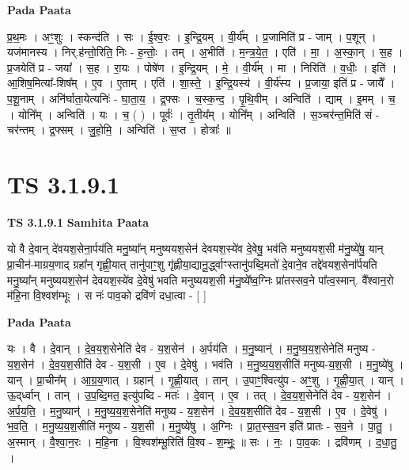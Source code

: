\documentclass[17pt]{extarticle}
\begin{document}
\textbf{Pada Paata} \newline

प्र॒थ॒मः । अꣳ॒॒शुः । स्कन्द॑ति । सः । ई॒श्व॒रः । इ॒न्द्रि॒यम् । वी॒र्य᳚म् । प्र॒जामिति॑ प्र - जाम् । प॒शून् । यज॑मानस्य । निर्.ह॑न्तो॒रिति॒ निः - ह॒न्तोः॒ । तम् । अ॒भीति॑ । म॒न्त्र॒ये॒त॒ । एति॑ । मा॒ । अ॒स्का॒न् । स॒ह । प्र॒जयेति॑ प्र - जया᳚ । स॒ह । रा॒यः । पोषे॑ण । इ॒न्द्रि॒यम् । मे॒ । वी॒र्य᳚म् । मा । निरिति॑ । व॒धीः॒ । इति॑ । आ॒शिष॒मित्या᳚-शिष᳚म् । ए॒व । ए॒ताम् । एति॑ । शा॒स्ते॒ । इ॒न्द्रि॒यस्य॑ । वी॒र्य॑स्य । प्र॒जाया॒ इति॑ प्र - जायै᳚ । प॒शू॒नाम् । अनि॑र्घाता॒येत्यनिः॑ - घा॒ता॒य॒ । द्र॒फ्सः । च॒स्क॒न्द॒ । पृ॒थि॒वीम् । अन्विति॑ । द्याम् । इ॒मम् । च॒ । योनि᳚म् । अन्विति॑ । यः । च॒ ( ) । पूर्वः॑ । तृ॒तीय᳚म् । योनि᳚म् । अन्विति॑ । स॒ञ्चर॑न्त॒मिति॑ सं - चर॑न्तम् । द्र॒फ्सम् । जु॒हो॒मि॒ । अन्विति॑ । स॒प्त । होत्राः᳚ ॥  \newline





\section{ TS 3.1.9.1 }

\textbf{TS 3.1.9.1 } \newline
\textbf{Samhita Paata} \newline

यो वै दे॒वान् दे॑वयश॒सेना॒र्पय॑ति मनु॒ष्या᳚न् मनुष्ययश॒सेन॑ देवयश॒स्ये॑व दे॒वेषु॒ भव॑ति मनुष्ययश॒सी म॑नु॒ष्ये॑षु॒ यान् प्रा॒चीन॑-माग्रय॒णाद् ग्रहा᳚न् गृह्णी॒यात् तानु॑पाꣳ॒॒शु गृ॑ह्णीया॒द्यानू॒र्द्ध्वाꣳस्तानु॑पब्दि॒मतो॑ दे॒वाने॒व तद्दे॑वयश॒सेना᳚र्पयति मनु॒ष्या᳚न् मनुष्ययश॒सेन॑ देवयश॒स्ये॑व दे॒वेषु॑ भवति मनुष्ययश॒सी म॑नु॒ष्ये᳚ष्व॒ग्निः प्रा॑तस्सव॒ने पा᳚त्व॒स्मान्. वै᳚श्वान॒रो म॑हि॒ना वि॒श्वश॑म्भूः । स नः॑ पाव॒को द्रवि॑णं दधा॒त्वा - [  ] \newline

\textbf{Pada Paata} \newline

यः । वै । दे॒वान् । दे॒व॒य॒श॒सेनेति॑ देव - य॒श॒सेन॑ । अ॒र्पय॑ति । म॒नु॒ष्यान्॑ । म॒नु॒ष्य॒य॒श॒सेनेति॑ मनुष्य - य॒श॒सेन॑ । दे॒व॒य॒श॒सीति॑ देव - य॒श॒सी । ए॒व । दे॒वेषु॑ । भव॑ति । म॒नु॒ष्य॒य॒श॒सीति॑ मनुष्य-य॒श॒सी । म॒नु॒ष्ये॑षु । यान् । प्रा॒चीन᳚म् । आ॒ग्र॒य॒णात् । ग्रहान्॑ । गृ॒ह्णी॒यात् । तान् । उ॒पाꣳ॒॒श्वित्यु॑प - अꣳ॒॒शु । गृ॒ह्णी॒या॒त् । यान् । ऊ॒द्‌र्ध्वान् । तान् । उ॒प॒ब्दि॒मत॒ इत्यु॑पब्दि - मतः॑ । दे॒वान् । ए॒व । तत् । दे॒व॒य॒श॒सेनेति॑ देव - य॒श॒सेन॑ । अ॒र्प॒य॒ति॒ । म॒नु॒ष्यान्॑ । म॒नु॒ष्य॒य॒श॒सेनेति॑ मनुष्य - य॒श॒सेन॑ । दे॒व॒य॒श॒सीति॑ देव - य॒श॒सी । ए॒व । दे॒वेषु॑ । भ॒व॒ति॒ । म॒नु॒ष्य॒य॒श॒सीति॑ मनुष्य - य॒श॒सी । म॒नु॒ष्ये॑षु । अ॒ग्निः । प्रा॒त॒स्स॒व॒न इति॑ प्रातः - स॒व॒ने । पा॒तु॒ ।अ॒स्मान् । वै॒श्वा॒न॒रः । म॒हि॒ना । वि॒श्वश॑म्भू॒रिति॑ वि॒श्व - श॒म्भूः॒ ॥ सः । नः॒ । पा॒व॒कः । द्रवि॑णम् । द॒धा॒तु॒ ।  \newline
\end{document}
